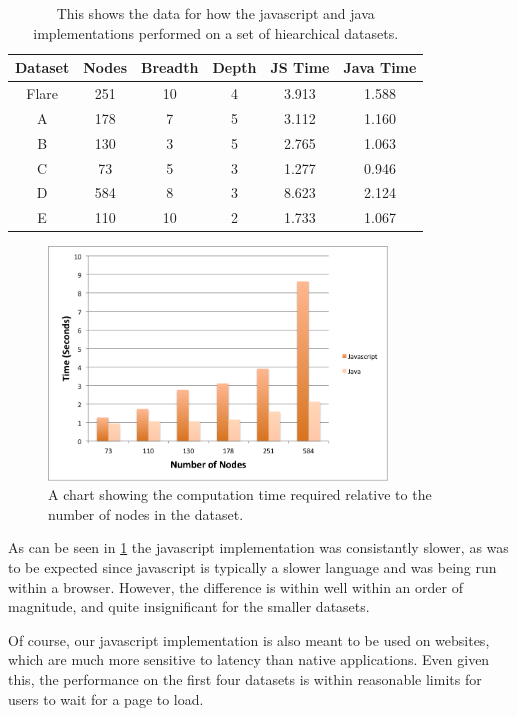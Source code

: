\documentclass{acm_proc_article-sp}
\begin{document}
\begin{table}
\begin{tabular}{ | c | c | c | c | c | c |}
\hline
Dataset & Nodes & Breadth & Depth & JS Time & Java Time \\
\hline
Flare & 251 & 10 & 4 & 3.913 & 1.588 \\
A & 178 & 7 & 5 & 3.112 & 1.160 \\
B & 130 & 3 & 5 & 2.765 & 1.063 \\
C & 73 & 5 & 3 & 1.277 & 0.946 \\
D & 584 & 8 & 3 & 8.623 & 2.124 \\
E & 110 & 10 & 2 & 1.733 & 1.067 \\
\hline
\end{tabular}
\caption{This shows the data for how the javascript and java implementations
  performed on a set of hiearchical datasets.}
\label{fig:table}
\end{table}


\begin{figure}
\centering
\includegraphics[width=90mm]{figures/chart.png}
\caption{\label{fig:chart}
  A chart showing the computation time required relative to the number
  of nodes in the dataset.
}
\end{figure}

As can be seen in \ref{fig:chart} the javascript implementation was
consistantly slower, as was to be expected since javascript is
typically a slower language and was being run within a
browser. However, the difference is within well within an order of
magnitude, and quite insignificant for the smaller datasets. 

Of course, our javascript implementation is also meant to be used on
websites, which are much more sensitive to latency than native
applications. Even given this, the performance on the first four
datasets is within reasonable limits for users to wait for a page to
load. 
\end{document}
